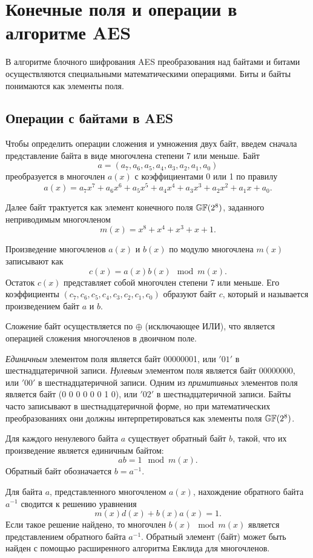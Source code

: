 \section{Конечные поля и операции в алгоритме AES}

В алгоритме блочного шифрования AES преобразования над байтами и битами осуществляются специальными математическими операциями. Биты и байты понимаются как элементы поля.

\subsection{Операции с байтами в AES}

Чтобы определить операции сложения и умножения двух байт, введем сначала представление байта в виде многочлена степени 7 или меньше. Байт
    \[ a =( a_7, a_6, a_5, a_4, a_3, a_2, a_1, a_0) \]
преобразуется в многочлен $a(x)$ с коэффициентами 0 или 1 по правилу
    \[ a(x) = a_{7}x^{7}+a_{6}x^{6}+a_{5}x^{5}+a_{4}x^{4}+a_{3}x^{3}+a_{2}x^{2}+a_{1}x+a_{0}. \]

Далее байт трактуется как элемент конечного поля $\mathbb{GF}(2^8)$, заданного неприводимым многочленом
    \[ m(x) = x^{8}+x^{4}+x^{3}+x +1. \]

Произведение многочленов $a(x)$ и $b(x)$  по модулю многочлена $m(x)$  записывают как
    \[ c(x) = a(x) b(x) \mod m(x). \]
Остаток $c(x)$ представляет собой многочлен степени 7 или меньше. Его коэффициенты $(c_{7}, c_{6}, c_{5}, c_{4}, c_{3}, c_{2}, c_{1}, c_{0})$ образуют байт $c$, который и называется произведением байт $a$ и $b$.

Сложение байт осуществляется по $\oplus$ (исключающее ИЛИ), что является операцией сложения многочленов в двоичном поле.

\emph{Единичным} элементом поля является байт 00000001, или $\mathrm{'01'}$ в шестнадцатеричной записи. \emph{Нулевым} элементом поля является байт 00000000, или $\mathrm{'00'}$ в шестнадцатеричной записи. Одним из \emph{примитивных} элементов поля является байт (0 0 0 0 0 0 1 0), или $\mathrm{'02'}$ в шестнадцатеричной записи. Байты часто записывают в шестнадцатеричной форме, но при математических преобразованиях они должны интерпретироваться как элементы поля $\mathbb{GF}(2^8)$.

Для каждого ненулевого байта $a$ существует обратный байт $b$, такой, что их произведение является единичным байтом:
    \[ a b = 1 \mod m(x). \]
Обратный байт обозначается $b = a^{-1}$.

Для байта $a$, представленного многочленом $a(x)$, нахождение обратного байта $a^{-1}$ сводится к решению уравнения
    \[ m(x) d(x) + b(x) a(x) = 1. \]
Если такое решение найдено, то многочлен $b(x) \mod m(x)$ является представлением обратного байта $a^{-1}$. Обратный элемент (байт) может быть найден с помощью расширенного алгоритма Евклида для многочленов.

